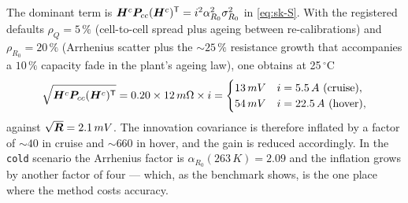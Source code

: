 The dominant term is $\bm{H}^c\bm{P}_{cc}(\bm{H}^c)^{\mathsf{T}} = i^2\alpha_{R_0}^2\sigma_{R_0}^2$ in
\eqref{eq:sk-S}.  With the registered defaults $\rho_Q = 5\,\%$ (cell-to-cell spread plus
ageing between re-calibrations) and $\rho_{R_0} = 20\,\%$ (Arrhenius scatter plus the
$\sim\!25\,\%$ resistance growth that accompanies a $10\,\%$ capacity fade in the plant's ageing
law), one obtains at 25\,\ensuremath{{}^\circ}C
\[
\sqrt{\mH^c\mP_{cc}(\mH^c)^\T} = 0.20\times12\,m\ensuremath{\Omega}\times i
  = \begin{cases} 13\,mV & i=5.5\,A\ (\text{cruise}),\\
                  54\,mV & i=22.5\,A\ (\text{hover}),\end{cases}
\]
against $\sqrt{\bm{R}}=2.1\,mV$.  The innovation covariance is therefore inflated by a
factor of $\sim\!40$ in cruise and $\sim\!660$ in hover, and the gain is reduced accordingly.  In
the \texttt{cold} scenario the Arrhenius factor is $\alpha_{R_0}(263\,K)=2.09$ and the
inflation grows by another factor of four --- which, as the benchmark shows, is the one place
where the method costs accuracy.

